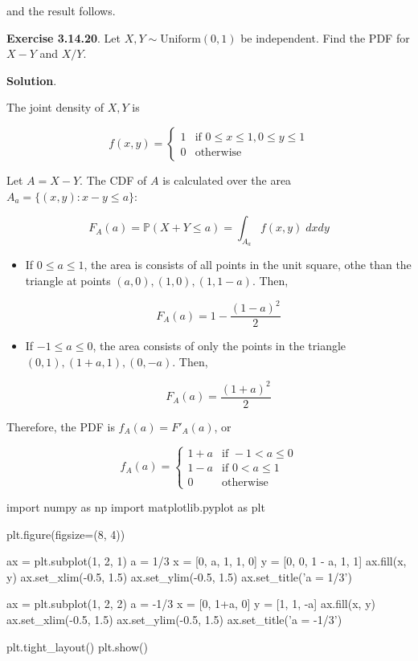 and the result follows.

\textbf{Exercise 3.14.20}. Let \(X, Y \sim \text{Uniform}(0, 1)\) be
independent. Find the PDF for \(X - Y\) and \(X / Y\).

\textbf{Solution}.

The joint density of \(X, Y\) is

\[ 
f(x, y) = \begin{cases}
1 &\text{if } 0 \leq x \leq 1, 0 \leq y \leq 1 \\
0 &\text{otherwise}
\end{cases}
\]

Let \(A = X - Y\). The CDF of \(A\) is calculated over the area
\(A_a = \{ (x, y) : x - y \leq a \}\):

\[ F_A(a) = \mathbb{P}(X + Y \leq a) = \int_{A_a} f(x, y)\; dx dy \]

\begin{itemize}
\item
  If \(0 \leq a \leq 1\), the area is consists of all points in the unit
  square, othe than the triangle at points
  \((a, 0), (1, 0), (1, 1 - a)\). Then,

  \[ F_A(a) = 1 - \frac{(1 - a)^{2}}{2} \]
\item
  If \(-1 \leq a \leq 0\), the area consists of only the points in the
  triangle \((0, 1), (1 + a, 1), (0, -a)\). Then,

  \[ F_A(a) = \frac{(1 + a)^{2}}{2} \]
\end{itemize}

Therefore, the PDF is \(f_A(a) = F'_A(a)\), or

\[ 
f_A(a) = \begin{cases}
1 + a &\text{if } -1 < a \leq 0 \\
1 - a &\text{if } 0 < a \leq 1 \\
0 &\text{otherwise}
\end{cases} 
\]

\begin{python}
import numpy as np
import matplotlib.pyplot as plt

plt.figure(figsize=(8, 4))

ax = plt.subplot(1, 2, 1)
a = 1/3
x = [0, a, 1, 1, 0]
y = [0, 0, 1 - a, 1, 1]
ax.fill(x, y)
ax.set_xlim(-0.5, 1.5)
ax.set_ylim(-0.5, 1.5)
ax.set_title('a = 1/3')

ax = plt.subplot(1, 2, 2)
a = -1/3
x = [0, 1+a, 0]
y = [1, 1, -a]
ax.fill(x, y)
ax.set_xlim(-0.5, 1.5)
ax.set_ylim(-0.5, 1.5)
ax.set_title('a = -1/3')

plt.tight_layout()
plt.show()
\end{python}

